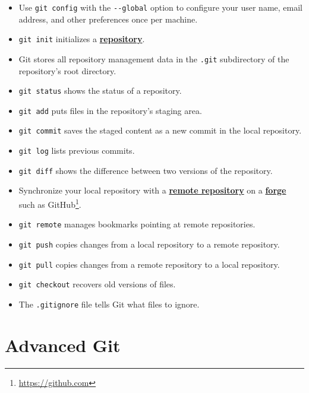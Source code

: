 \documentclass[
]{krantz}
\providecommand{\tightlist}{%
  \setlength{\itemsep}{0pt}\setlength{\parskip}{0pt}}
\renewcommand{\href}[2]{#2\footnote{\url{#1}}}
\newcommand{\gref}[2]{\hyperlink{#2}{\textbf{#1}}}
\begin{document}
\begin{itemize}
\tightlist
\item
  Use \texttt{git\ config} with the \texttt{-\/-global} option to configure your user name,
  email address, and other preferences once per machine.
\item
  \texttt{git\ init} initializes a \gref{repository}{repository}.
\item
  Git stores all repository management data in the \texttt{.git} subdirectory of the repository's root directory.
\item
  \texttt{git\ status} shows the status of a repository.
\item
  \texttt{git\ add} puts files in the repository's staging area.
\item
  \texttt{git\ commit} saves the staged content as a new commit in the local repository.
\item
  \texttt{git\ log} lists previous commits.
\item
  \texttt{git\ diff} shows the difference between two versions of the repository.
\item
  Synchronize your local repository with a \gref{remote repository}{remote\_repository}
  on a \gref{forge}{forge} such as \href{https://github.com}{GitHub}.
\item
  \texttt{git\ remote} manages bookmarks pointing at remote repositories.
\item
  \texttt{git\ push} copies changes from a local repository to a remote repository.
\item
  \texttt{git\ pull} copies changes from a remote repository to a local repository.
\item
  \texttt{git\ checkout} recovers old versions of files.
\item
  The \texttt{.gitignore} file tells Git what files to ignore.
\end{itemize}

\hypertarget{advanced-git-1}{%
\section{Advanced Git}\label{advanced-git-1}}
\end{document}
